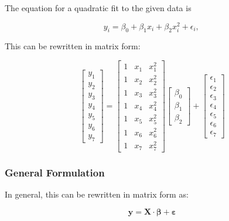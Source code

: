 The equation for a quadratic fit to the given data is

\begin{equation}
  y_i = \beta_0 + \beta_1 x_i + \beta_2 x_i^2 +\epsilon_i, \,
\end{equation}

This can be rewritten in matrix form:

\begin{equation}\label{eq:polynomialRegression}
  \begin{bmatrix}y_1 \\ y_2 \\ y_3 \\ y_4 \\ y_5 \\ y_6 \\ y_7 \end{bmatrix}
  =
  \begin{bmatrix}1 & x_1 & x_1^2 \\1 & x_2  & x_2^2 \\1 & x_3  & x_3^2 \\1 & x_4  & x_4^2 \\1 & x_5  & x_5^2 \\1 & x_6  & x_6^2 \\ 1 & x_7  & x_7^2 \end{bmatrix}
  \begin{bmatrix} \beta_0 \\ \beta_1  \\ \beta_2 \end{bmatrix}
  +
  \begin{bmatrix} \epsilon_1 \\ \epsilon_2 \\ \epsilon_3 \\ \epsilon_4 \\ \epsilon_5 \\ \epsilon_6 \\ \epsilon_7 \end{bmatrix}
\end{equation}

\subsubsection{General Formulation}

In general, this can be rewritten in matrix form as:

\begin{equation}\label{eq:DesignMatrix}
    \mathbf{y} = \mathbf{X} \cdot \mathbf{\beta } + \mathbf{\varepsilon }
\end{equation}

